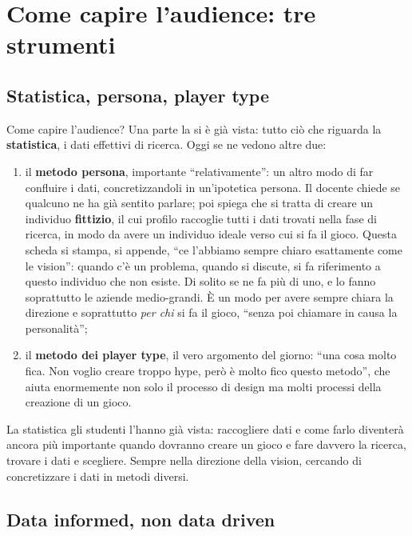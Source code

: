 \section{Come capire l'audience: tre strumenti}
\label{gd18:sec:strumenti}

\subsection{Statistica, persona, player type}

Come capire l'audience? Una parte la si è già vista: tutto ciò che riguarda la
\textbf{statistica}, i dati effettivi di ricerca. Oggi se ne vedono altre due:
\begin{enumerate}
  \item il \textbf{metodo persona}, importante ``relativamente'': un altro modo di
        far confluire i dati, concretizzandoli in un'ipotetica persona. Il docente
        chiede se qualcuno ne ha già sentito parlare; poi spiega che si tratta di
        creare un individuo \textbf{fittizio}, il cui profilo raccoglie tutti i dati
        trovati nella fase di ricerca, in modo da avere un individuo ideale verso
        cui si fa il gioco. Questa scheda si stampa, si appende, ``ce l'abbiamo
        sempre chiaro esattamente come le vision'': quando c'è un problema, quando
        si discute, si fa riferimento a questo individuo che non esiste. Di solito
        se ne fa più di uno, e lo fanno soprattutto le aziende medio-grandi. È un
        modo per avere sempre chiara la direzione e soprattutto \emph{per chi} si fa
        il gioco, ``senza poi chiamare in causa la personalità'';
  \item il \textbf{metodo dei player type}, il vero argomento del giorno: ``una cosa
        molto fica. Non voglio creare troppo hype, però è molto fico questo metodo'',
        che aiuta enormemente non solo il processo di design ma molti processi della
        creazione di un gioco.
\end{enumerate}

La statistica gli studenti l'hanno già vista: raccogliere dati e come farlo
diventerà ancora più importante quando dovranno creare un gioco e fare davvero la
ricerca, trovare i dati e scegliere. Sempre nella direzione della vision, cercando di
concretizzare i dati in metodi diversi.

\subsection{Data informed, non data driven}

